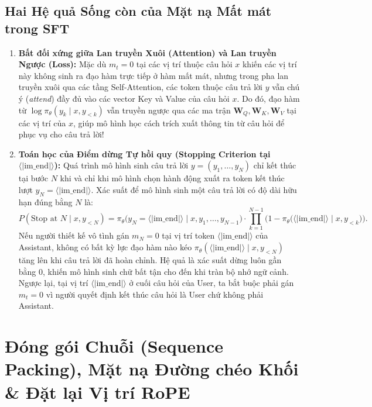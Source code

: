 \subsection{Hai Hệ quả Sống còn của Mặt nạ Mất mát trong SFT}
\begin{enumerate}[leftmargin=1.2cm]
    \item \textbf{Bất đối xứng giữa Lan truyền Xuôi (Attention) và Lan truyền Ngược (Loss):}
    Mặc dù $m_t = 0$ tại các vị trí thuộc câu hỏi $x$ khiến các vị trí này không sinh ra đạo hàm trực tiếp ở hàm mất mát, nhưng trong pha lan truyền xuôi qua các tầng Self-Attention, các token thuộc câu trả lời $y$ vẫn chú ý (\textit{attend}) đầy đủ vào các vector Key và Value của câu hỏi $x$. Do đó, đạo hàm từ $\log \pi_\theta(y_k \mid x, y_{<k})$ vẫn truyền ngược qua các ma trận $\mathbf{W}_Q, \mathbf{W}_K, \mathbf{W}_V$ tại các vị trí của $x$, giúp mô hình học cách trích xuất thông tin từ câu hỏi để phục vụ cho câu trả lời!
    \item \textbf{Toán học của Điểm dừng Tự hồi quy (Stopping Criterion tại $\langle|\text{im\_end}|\rangle$):}
    Quá trình mô hình sinh câu trả lời $y = (y_1, \dots, y_N)$ chỉ kết thúc tại bước $N$ khi và chỉ khi mô hình chọn hành động xuất ra token kết thúc lượt $y_N = \langle|\text{im\_end}|\rangle$. Xác suất để mô hình sinh một câu trả lời có độ dài hữu hạn đúng bằng $N$ là:
    \begin{equation}
        P(\text{Stop at } N \mid x, y_{<N}) = \pi_\theta\big(y_N = \langle|\text{im\_end}|\rangle \;\big|\; x, y_1, \dots, y_{N-1}\big) \cdot \prod_{k=1}^{N-1} \Big(1 - \pi_\theta\big(\langle|\text{im\_end}|\rangle \mid x, y_{<k}\big)\Big).
    \end{equation}
    Nếu người thiết kế vô tình gán $m_N = 0$ tại vị trí token $\langle|\text{im\_end}|\rangle$ của Assistant, không có bất kỳ lực đạo hàm nào kéo $\pi_\theta(\langle|\text{im\_end}|\rangle \mid x, y_{<N})$ tăng lên khi câu trả lời đã hoàn chỉnh. Hệ quả là xác suất dừng luôn gần bằng $0$, khiến mô hình sinh chữ bất tận cho đến khi tràn bộ nhớ ngữ cảnh. Ngược lại, tại vị trí $\langle|\text{im\_end}|\rangle$ ở cuối câu hỏi của User, ta bắt buộc phải gán $m_t = 0$ vì người quyết định kết thúc câu hỏi là User chứ không phải Assistant.
\end{enumerate}

\section{Đóng gói Chuỗi (Sequence Packing), Mặt nạ Đường chéo Khối \& Đặt lại Vị trí RoPE}
\label{sec:sequence_packing}

